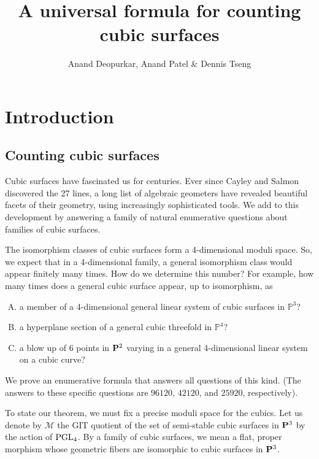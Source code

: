 \documentclass[12pt,reqno]{amsart}
\title{A universal formula for counting cubic surfaces}
\author{Anand Deopurkar, Anand Patel
  \& Dennis Tseng}
\numberwithin{equation}{section}
\begin{document}
\maketitle


\section{Introduction}
\label{sec:intro}

\subsection{Counting cubic surfaces}\label{sec:counting}
Cubic surfaces have fascinated us for centuries. Ever since Cayley and
Salmon discovered the 27 lines, a long list of
algebraic geometers have revealed beautiful facets of their geometry,
using increasingly sophisticated tools. We add to this
development by answering a family of natural enumerative questions
about families of cubic surfaces.

The isomorphism classes of cubic surfaces form a 4-dimensional moduli
space. So, we expect that in a 4-dimensional family, a general
isomorphism class would appear finitely many times. How do we
determine this number? For example, how many times does a general
cubic surface appear, up to isomorphism, as
\begin{enumerate}[(A)]
\item \label{orbit} a member of a 4-dimensional general linear system of cubic surfaces in $\mathbb
  P^3$?
\item \label{slice} a hyperplane section of a general cubic threefold in $\mathbb
  P^4$?
\item a blow up of 6 points in $\P^2$ varying in a general
  4-dimensional linear system on a cubic curve?
\end{enumerate}
We prove an enumerative formula that answers all questions of this kind.
(The answers to these specific questions are $96120$, $42120$, and
$25920$, respectively).

To state our theorem, we must fix a precise moduli space for the
cubics.  Let us denote by $\mathcal M$ the GIT quotient of the set of
semi-stable cubic surfaces in $\P^3$ by the action of
$\PGL_4$.  By a family of cubic surfaces, we mean a flat, proper
morphism whose geometric fibers are isomorphic to cubic surfaces in
$\P^3$.
\end{document}
